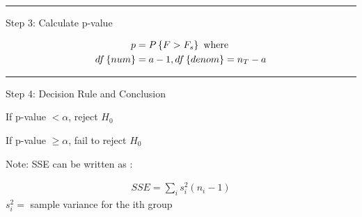\documentclass[10pt]{article}
\newcommand{\emphas}[1]{\colorbox{DarkSeaGreen2}{#1}}
\newcommand{\svar}[1]{s^2_{#1}} %
\newcommand{\prob}[1]{P\left\{#1\right\}}
\newcommand{\drawline}{\noindent\rule{\linewidth}{0.1pt}}
\begin{document}
\begin{multicols}{3}
    \drawline

    Step 3: Calculate \emphas{p-value}

    \begin{align*}
        p & = \prob{F > F_s} \text{ where}\\
        \df{num} & = a-1, \df{denom} = n_T - a
    \end{align*}

    \drawline

    Step 4: \emphas{Decision Rule and Conclusion}

    If p-value $< \alpha$, reject $H_0$

    If p-value $\geq \alpha$, fail to reject $H_0$

    Note: SSE can be written as :

    \begin{align*}
        SSE = \sum_i \svar{i} (n_i - 1)
    \end{align*}
    $\svar{i} =$ sample variance for the ith group

\end{multicols}
\end{document}

